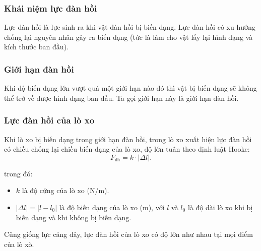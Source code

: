 \subsubsection{Khái niệm lực đàn hồi}
	Lực đàn hồi là lực sinh ra khi vật đàn hồi bị biến dạng. Lực đàn hồi có xu hướng chống lại nguyên nhân gây ra biến dạng (tức là làm cho vật lấy lại hình dạng và kích thước ban đầu).
\subsubsection{Giới hạn đàn hồi}
	Khi độ biến dạng lớn vượt quá một giới hạn nào đó thì  vật bị biến dạng sẽ không thể trở về được hình dạng ban đầu. Ta gọi giới hạn này là giới hạn đàn hồi. 		

\subsubsection{Lực đàn hồi của lò xo}
	Khi lò xo bị biến dạng trong giới hạn đàn hồi, trong lò xo xuất hiện lực đàn hồi có chiều chống lại chiều biến dạng của lò xo, độ lớn tuân theo định luật Hooke: 
		\begin{equation}
			F_\text{đh}= k \cdot |\Delta l|.
		\end{equation}
	
	trong đó:
		\begin{itemize}
			\item $k$ là độ cứng của lò xo (N/m).
			\item $|\Delta l|=|l-l_0|$ là độ biến dạng của lò xo (m), với $l$ và $l_0$ là độ dài lò xo khi bị biến dạng và khi không bị biến dạng. 
		\end{itemize}
	Cũng giống lực căng dây, lực đàn hồi của lò xo có độ lớn như nhau tại mọi điểm của lò xò. 
